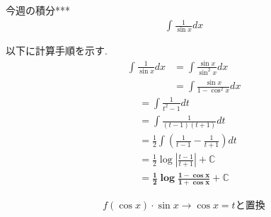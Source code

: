 \documentclass[main]{subfiles}
\begin{document}

\begin{mondai}{5}{今週の積分}{***}
    \begin{align*}
        \int \frac{1}{\sin x} dx
    \end{align*}
\end{mondai}


\solutionhead
\hfill
以下に計算手順を示す.
\hfill\
\begin{align*}
    \int \frac{1}{\sin x} dx
        &= \int \frac{\sin x}{\sin^2 x} dx \\
        &= \int \frac{\sin x}{1-\cos^2 x} dx
\end{align*}
\begin{align*}
        &= \int \frac{1}{t^2-1} dt \\
        &= \int \frac{1}{(t-1)(t+1)} dt \\
        &= \frac{1}{2}\int \left(\frac{1}{t-1}-\frac{1}{t+1}\right) dt \\
        &= \frac{1}{2} \log \left|\frac{t-1}{t+1}\right|+\mathbb{C}  \\
        &= \boldsymbol{\frac{1}{2} \log \frac{1-\cos x}{1+\cos x}+\mathbb{C}}
\end{align*}

\begin{focusbox}
\centering
\vspace*{-0.9\baselineskip}
\begin{align*}
    f(\cos x)\cdot \sin x \rightarrow \cos x = t \text{と置換}
\end{align*}
\end{focusbox}
\end{document}
